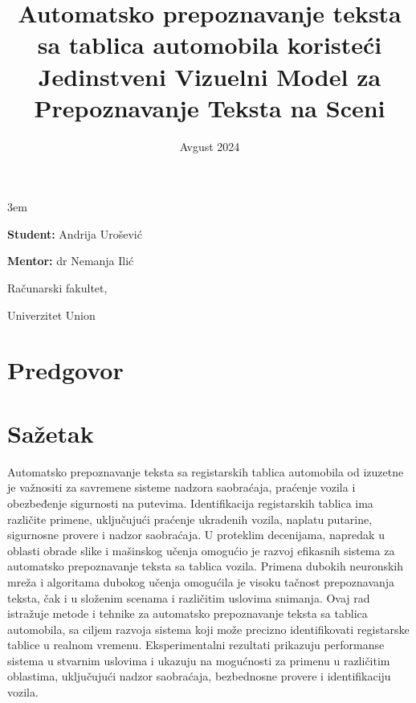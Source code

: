 \documentclass[a4paper,12pt]{article}
\title{Automatsko prepoznavanje teksta sa tablica \todo[color=green!40]{vozila, ne nuzno automobila?}automobila koristeći Jedinstveni Vizuelni Model za Prepoznavanje Teksta na Sceni}
\date{}
\begin{document}
	\emergencystretch 3em
	\begin{titlepage}
		\centering
		{\huge\bfseries \maketitle}
		
		{\large
			\textbf{Student:}
			Andrija Urošević
			\par
			\bigskip
			\textbf{Mentor:}
			dr Nemanja Ilić
		}
	
		\vfill
		{\large Računarski fakultet,\par}
		{\large Univerzitet Union\par}
		\bigskip
		\date{Avgust 2024}
	\end{titlepage}
	
	
	\section*{Predgovor}
	\newpage
	
	\tableofcontents
	\newpage
	
	
	\section*{Sažetak}
	\noindent
	Automatsko prepoznavanje teksta sa registarskih tablica automobila od izuzetne je važnositi za savremene sisteme nadzora saobraćaja, praćenje vozila i obezbeđenje sigurnosti na putevima. Identifikacija registarskih tablica ima različite primene, uključujući praćenje ukradenih vozila, naplatu putarine, sigurnosne provere i nadzor saobraćaja. U proteklim decenijama, napredak u oblasti obrade slike i mašinskog učenja omogućio je razvoj efikasnih sistema za automatsko prepoznavanje teksta sa tablica vozila. Primena dubokih neuronskih mreža i algoritama dubokog učenja omogućila je visoku tačnost prepoznavanja teksta, čak i u složenim scenama i različitim uslovima snimanja. Ovaj rad istražuje metode i tehnike za automatsko prepoznavanje teksta sa tablica automobila, sa ciljem razvoja sistema koji može precizno identifikovati registarske tablice u realnom vremenu. Eksperimentalni rezultati prikazuju performanse sistema u stvarnim uslovima i ukazuju na mogućnosti za primenu u različitim oblastima, uključujući nadzor saobraćaja, bezbednosne provere i identifikaciju vozila.
	\newpage
	
\end{document}
